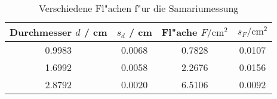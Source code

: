 \begin{table}[H]
\caption{Verschiedene Fl"achen f"ur die Samariumessung}
\begin{center}
\begin{tabular}{|c|c|c|c|}
  \hline
  Durchmesser $d$ / cm & $s_d$ / cm & Fl"ache $F / \text{cm}^2$ & $s_F / \text{cm}^2$ \\ \hline 
  0.9983 & 0.0068 & 0.7828 & 0.0107 \\ \hline
  1.6992 & 0.0058 & 2.2676 & 0.0156 \\ \hline
  2.8792 & 0.0020 & 6.5106 & 0.0092 \\ \hline
\end{tabular}
\end{center}
\label{tab:data:samarium:area}
\end{table}
